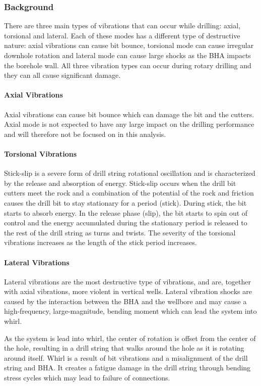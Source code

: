 \subsubsection{Background}
There are three main types of vibrations that can occur while drilling: axial, torsional and lateral. Each of these modes has a different type of destructive nature: axial vibrations can cause bit bounce, torsional mode can cause irregular downhole rotation and lateral mode can cause large shocks as the BHA impacts the borehole wall. All three vibration types can occur during rotary drilling and they can all cause significant damage.

\paragraph{Axial Vibrations}
Axial vibrations can cause bit bounce which can damage the bit and the cutters. Axial mode is not expected to have any large impact on the drilling performance and will therefore not be focused on in this analysis.

\paragraph{Torsional Vibrations}
Stick-slip is a severe form of drill string rotational oscillation and is characterized by the release and absorption of energy. Stick-slip occurs when the drill bit cutters meet the rock and a combination of the potential of the rock and friction causes the drill bit to stay stationary for a period (stick). During stick, the bit starts to absorb energy. In the release phase (slip), the bit starts to spin out of control and the energy accumulated during the stationary period is released to the rest of the drill string as turns and twists. The severity of the torsional vibrations increases as the length of the stick period increases.

\paragraph{Lateral Vibrations}
Lateral vibrations are the most destructive type of vibrations, and are, together with axial vibrations, more violent in vertical wells.  Lateral vibration shocks are caused by the interaction between the BHA and the wellbore and may cause a high-frequency, large-magnitude, bending moment which can lead the system into whirl. 

As the system is lead into whirl, the center of rotation is offset from the center of the hole, resulting in a drill string that walks around the hole as it is rotating around itself. Whirl is a result of bit vibrations and a misalignment of the drill string and BHA. It creates a fatigue damage in the drill string through bending stress cycles which may lead to failure of connections. 

